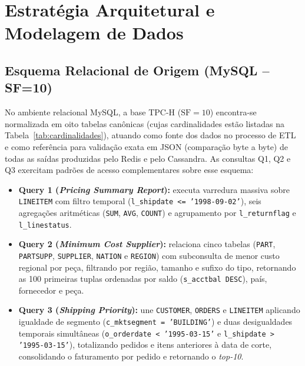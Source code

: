 \documentclass[12pt,a4paper]{article}
\begin{document}
\section{Estratégia Arquitetural e Modelagem de Dados}

\subsection{Esquema Relacional de Origem (MySQL -- SF=10)}
No ambiente relacional MySQL, a base TPC-H ($\text{SF}=10$) encontra-se normalizada em oito tabelas canônicas (cujas cardinalidades estão listadas na Tabela~\ref{tab:cardinalidades}), atuando como fonte dos dados no processo de ETL e como referência para validação exata em JSON (comparação byte a byte) de todas as saídas produzidas pelo Redis e pelo Cassandra. As consultas Q1, Q2 e Q3 exercitam padrões de acesso complementares sobre esse esquema:

\begin{itemize}
    \item \textbf{Query 1 (\textit{Pricing Summary Report}):} executa varredura massiva sobre \texttt{LINEITEM} com filtro temporal (\texttt{l\_shipdate <= '1998-09-02'}), seis agregações aritméticas (\texttt{SUM}, \texttt{AVG}, \texttt{COUNT}) e agrupamento por \texttt{l\_returnflag} e \texttt{l\_linestatus}.
    \item \textbf{Query 2 (\textit{Minimum Cost Supplier}):} relaciona cinco tabelas (\texttt{PART}, \texttt{PARTSUPP}, \texttt{SUPPLIER}, \texttt{NATION} e \texttt{REGION}) com subconsulta de menor custo regional por peça, filtrando por região, tamanho e sufixo do tipo, retornando as 100 primeiras tuplas ordenadas por saldo (\texttt{s\_acctbal DESC}), país, fornecedor e peça.
    \item \textbf{Query 3 (\textit{Shipping Priority}):} une \texttt{CUSTOMER}, \texttt{ORDERS} e \texttt{LINEITEM} aplicando igualdade de segmento (\texttt{c\_mktsegment = 'BUILDING'}) e duas desigualdades temporais simultâneas (\texttt{o\_orderdate < '1995-03-15'} e \texttt{l\_shipdate > '1995-03-15'}), totalizando pedidos e itens anteriores à data de corte, consolidando o faturamento por pedido e retornando o \textit{top-10}.
\end{itemize}
\end{document}
